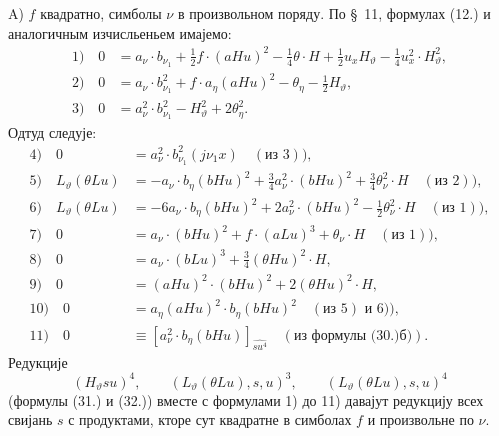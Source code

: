﻿\documentclass[11pt]{article}
\begin{document}
\mbox{A)} $f$ квадратно, симболы $\nu$ в произвольном поряду. По \S\ 11, формулах (12.) и аналогичным изчисльеньем имајемо:
\begin{align*}
1)\quad 0&=a_\nu\cdot b_{\nu_1}+\frac12f\cdot(aHu)^2-\frac14\theta\cdot H+\frac12u_xH_\vartheta-\frac14u_x^2\cdot H_\vartheta^2,\\
2)\quad 0&=a_\nu\cdot b_{\nu_1}^2+f\cdot a_\eta(aHu)^2-\theta_\eta-\frac12H_\vartheta,\\
3)\quad 0&=a_\nu^2\cdot b_{\nu_1}^2-H_\vartheta^2+2\theta_\eta^2.
\end{align*}
Одтуд следује:
\begin{align*}
4)\quad 0&=a_\nu^2\cdot b_{\nu_1}^2(j\nu_1x)\quad(\text{из }3)),\\
5)\quad L_\vartheta(\theta Lu)&=-a_\nu\cdot b_\eta(bHu)^2+\frac34a_\nu^2\cdot(bHu)^2+\frac34\theta_\nu^2\cdot H\quad(\text{из }2)),\\
6)\quad L_\vartheta(\theta Lu)&=-6a_\nu\cdot b_\eta(bHu)^2+2a_\nu^2\cdot(bHu)^2-\frac12\theta_\nu^2\cdot H\quad(\text{из }1)),\\
7)\quad 0&=a_\nu\cdot(bHu)^2+f\cdot(aLu)^3+\theta_\nu\cdot H\quad(\text{из }1)),\\
8)\quad 0&=a_\nu\cdot(bLu)^3+\frac34(\theta Hu)^2\cdot H,\\
9)\quad 0&=(aHu)^2\cdot(bHu)^2+2(\theta Hu)^2\cdot H,\\
10)\quad 0&=a_\eta(aHu)^2\cdot b_\eta(bHu)^2\quad(\text{из }5)\text{ и }6)),\\
11)\quad 0&\equiv [a_\nu^2\cdot b_\eta(bHu)]_{\widehat{su^4}}\quad(\text{из формулы (30.)б)}).
\end{align*}
Редукције
\[
(H_\vartheta su)^4,
\qquad (L_\vartheta(\theta Lu),s,u)^3,
\qquad (L_\vartheta(\theta Lu),s,u)^4
\]
(формулы (31.) и (32.)) вместе с формулами 1) до 11) давајут редукцију всех свијань $s$ с продуктами, кторе сут квадратне в симболах $f$ и произвольне по $\nu$.
\end{document}
